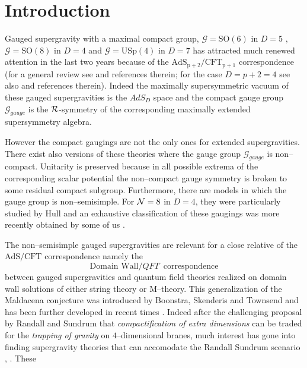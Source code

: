 \documentclass[a4paper,12pt]{article}
\begin{document}
\section{Introduction}
Gauged supergravity with a maximal compact group, $\mathcal{G}=\mathrm{SO(6)}$ in $D=5$
\cite{gunwar,PPV}, $\mathcal{G}=\mathrm{SO(8)}$ in
$D=4$ \cite{dewitnicol} and $\mathcal{G}=\mathrm{USp(4)}$ in $D=7$ \cite{Pernici:1984xx}
has attracted much renewed attention in the last two
years because of the $\mathrm{AdS_{p+2}/CFT_{p+1}}$ correspondence (for a general review
see \cite{Aharony:2000ti} and references therein; for the case $D=p+2=4$ see also
\cite{Gualtieri:1999tu} and references therein). Indeed the
maximally supersymmetric vacuum of these gauged supergravities is the $AdS_D$
space and the compact gauge group $\mathcal{G}_{gauge}$ is the
$\cal{R}$-symmetry of the corresponding maximally extended supersymmetry algebra.
\par
However the compact gaugings are not the only ones for extended
supergravities. There exist also versions of these theories where the gauge
group  $\mathcal{G}_{gauge}$ is non--compact. Unitarity is preserved because
in all possible extrema of the corresponding  scalar potential the
non--compact gauge symmetry is broken to some residual compact subgroup.
Furthermore, there are models in which the gauge group is non--semisimple.
For ${\cal N} =8$ in $D=4$, they were particularly studied by Hull \cite{hull,hull2}
and an exhaustive classification of these  gaugings
was more recently obtained  by some of us \cite{noi4D}.
\par
The non--semisimple gauged supergravities are  relevant for a close relative of the
$\mathrm{AdS/CFT}$ correspondence namely the
\begin{equation}
  \mbox{Domain Wall}/QFT \,\,\, \mbox{correspondence}
\label{domwalqft}
\end{equation}
between gauged supergravities and quantum field theories realized on domain wall
solutions of either string theory or M--theory. This generalization of the Maldacena
conjecture was introduced by Boonstra, Skenderis and Townsend \cite{Boonstra:1999mp}
and has been further developed in recent times \cite{Cvetic:2000pn,Cvetic:2000ah}.
Indeed after the challenging proposal by Randall and Sundrum \cite{Randalsud}
that {\it compactification of extra dimensions} can be traded for the {\it trapping of
gravity} on $4$--dimensional branes, much interest has gone into finding
supergravity theories that can accomodate the Randall Sundrum scenario
\cite{Ceresole:2000jd}, \cite{newduffo} . These
\end{document}
